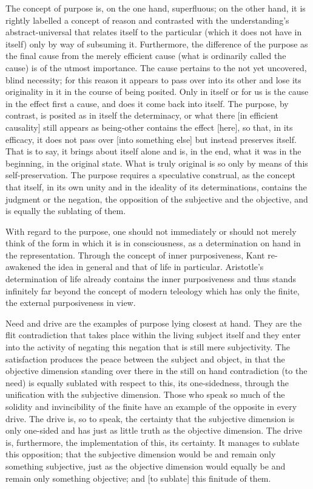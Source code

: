 The concept of purpose is, on the one hand, superfluous;
on the other hand, it is rightly labelled a concept of reason
and contrasted with the understanding's abstract-universal
that relates itself to the particular
(which it does not have in itself)
only by way of subsuming it.
Furthermore, the difference of the purpose
as the final cause
from the merely efficient cause
(what is ordinarily called the cause)
is of the utmost importance.
The cause pertains to the not yet uncovered, blind necessity;
for this reason it appears to pass over into its other
and lose its originality in it in the course of being posited.
Only in itself or for us is the cause in the effect first a cause,
and does it come back into itself.
The purpose, by contrast, is posited as in itself the determinacy,
or what there [in efficient causality] still appears as being-other
contains the effect [here], so that, in its efficacy,
it does not pass over [into something else]
but instead preserves itself.
That is to say, it brings about itself alone
and is, in the end, what it was in the beginning,
in the original state.
What is truly original is so only
by means of this self-preservation.
The purpose requires a speculative construal,
as the concept that itself,
in its own unity and in the ideality of its determinations,
contains the judgment or the negation,
the opposition of the subjective and the objective,
and is equally the sublating of them.

With regard to the purpose,
one should not immediately
or should not merely think of
the form in which it is in consciousness,
as a determination on hand in the representation.
Through the concept of inner purposiveness,
Kant re-awakened the idea in general
and that of life in particular.
Aristotle's determination of life
already contains the inner purposiveness
and thus stands infinitely far beyond
the concept of modern teleology
which has only the finite,
the external purposiveness in view.

Need and drive are the examples of purpose lying closest at hand.
They are the flit contradiction that takes place within the living
subject itself and they enter into the activity of negating this
negation that is still mere subjectivity.
The satisfaction produces the peace between the subject and object,
in that the objective dimension standing over there
in the still on hand contradiction (to the need)
is equally sublated with respect to this, its one-sidedness,
through the unification with the subjective dimension.
Those who speak so much of the solidity and invincibility of
the finite have an example of the opposite in every drive.
The drive is, so to speak, the certainty that
the subjective dimension is only one-sided
and has just as little truth as the objective dimension.
The drive is, furthermore, the implementation of this, its certainty.
It manages to sublate this opposition;
that the subjective dimension
would be and remain only something subjective,
just as the objective dimension
would equally be and remain only something objective;
and [to sublate] this finitude of them.

